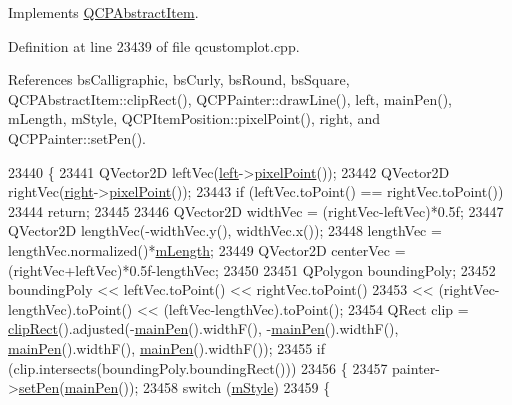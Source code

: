 Implements \hyperlink{class_q_c_p_abstract_item_ad0dc056f650c3ca73414e6b4f01674ef}{Q\+C\+P\+Abstract\+Item}.



Definition at line 23439 of file qcustomplot.\+cpp.



References bs\+Calligraphic, bs\+Curly, bs\+Round, bs\+Square, Q\+C\+P\+Abstract\+Item\+::clip\+Rect(), Q\+C\+P\+Painter\+::draw\+Line(), left, main\+Pen(), m\+Length, m\+Style, Q\+C\+P\+Item\+Position\+::pixel\+Point(), right, and Q\+C\+P\+Painter\+::set\+Pen().


\begin{DoxyCode}
23440 \{
23441   QVector2D leftVec(\hyperlink{class_q_c_p_item_bracket_af6cc6d27d96171778c6927d6edce48b0}{left}->\hyperlink{class_q_c_p_item_position_ae490f9c76ee2ba33752c495d3b6e8fb5}{pixelPoint}());
23442   QVector2D rightVec(\hyperlink{class_q_c_p_item_bracket_afa6c1360b05a50c4e0df37b3cebab6be}{right}->\hyperlink{class_q_c_p_item_position_ae490f9c76ee2ba33752c495d3b6e8fb5}{pixelPoint}());
23443   \textcolor{keywordflow}{if} (leftVec.toPoint() == rightVec.toPoint())
23444     \textcolor{keywordflow}{return};
23445   
23446   QVector2D widthVec = (rightVec-leftVec)*0.5f;
23447   QVector2D lengthVec(-widthVec.y(), widthVec.x());
23448   lengthVec = lengthVec.normalized()*\hyperlink{class_q_c_p_item_bracket_ab3d99bba8da18eb4d0e0cb23dded33b2}{mLength};
23449   QVector2D centerVec = (rightVec+leftVec)*0.5f-lengthVec;
23450 
23451   QPolygon boundingPoly;
23452   boundingPoly << leftVec.toPoint() << rightVec.toPoint()
23453                << (rightVec-lengthVec).toPoint() << (leftVec-lengthVec).toPoint();
23454   QRect clip = \hyperlink{class_q_c_p_abstract_item_a538e25ff8856534582f5b2b400a46405}{clipRect}().adjusted(-\hyperlink{class_q_c_p_item_bracket_a8df4ad873bf88a4a7bfb9bbbd490e495}{mainPen}().widthF(), -\hyperlink{class_q_c_p_item_bracket_a8df4ad873bf88a4a7bfb9bbbd490e495}{mainPen}().widthF(), 
      \hyperlink{class_q_c_p_item_bracket_a8df4ad873bf88a4a7bfb9bbbd490e495}{mainPen}().widthF(), \hyperlink{class_q_c_p_item_bracket_a8df4ad873bf88a4a7bfb9bbbd490e495}{mainPen}().widthF());
23455   \textcolor{keywordflow}{if} (clip.intersects(boundingPoly.boundingRect()))
23456   \{
23457     painter->\hyperlink{class_q_c_p_painter_af9c7a4cd1791403901f8c5b82a150195}{setPen}(\hyperlink{class_q_c_p_item_bracket_a8df4ad873bf88a4a7bfb9bbbd490e495}{mainPen}());
23458     \textcolor{keywordflow}{switch} (\hyperlink{class_q_c_p_item_bracket_ac911907184c824d621f274f8e0990080}{mStyle})
23459     \{

\end{DoxyCode}
